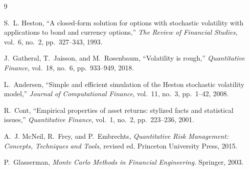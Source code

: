 \documentclass[11pt,a4paper]{article}
\begin{document}
\begin{thebibliography}{9}

S.~L. Heston, ``A closed-form solution for options with stochastic volatility with applications to bond and currency options,'' \textit{The Review of Financial Studies}, vol.~6, no.~2, pp.~327--343, 1993.

J.~Gatheral, T.~Jaisson, and M.~Rosenbaum, ``Volatility is rough,'' \textit{Quantitative Finance}, vol.~18, no.~6, pp.~933--949, 2018.

L.~Andersen, ``Simple and efficient simulation of the Heston stochastic volatility model,'' \textit{Journal of Computational Finance}, vol.~11, no.~3, pp.~1--42, 2008.

R.~Cont, ``Empirical properties of asset returns: stylized facts and statistical issues,'' \textit{Quantitative Finance}, vol.~1, no.~2, pp.~223--236, 2001.

A.~J. McNeil, R.~Frey, and P.~Embrechts, \textit{Quantitative Risk Management: Concepts, Techniques and Tools}, revised ed. Princeton University Press, 2015.

P.~Glasserman, \textit{Monte Carlo Methods in Financial Engineering}. Springer, 2003.

\end{thebibliography}
\end{document}
